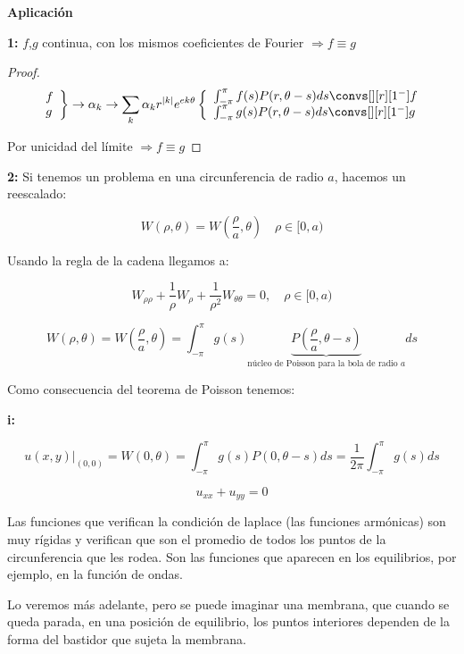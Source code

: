 		\textbf{Aplicación}

		\textbf{1:} $f$,$g$ continua, con los mismos coeficientes de Fourier $\Rightarrow f \equiv g$

		\begin{proof}
			\[
				\left. \begin{array}{l}
				f \\
				g
				\end{array} \right\} \rightarrow \alpha_k \rightarrow \sum_k \alpha_k r^{|k|} e^{ek\theta} \left\{ \begin{array}{l}
					\int^{\pi}_{-\pi} f(s) P(r, \theta - s)ds \convs[][r][1^-] f \\
					\int^{\pi}_{-\pi} g(s) P(r, \theta - s)ds \convs[][r][1^-] g
				\end{array} \right.
			\]

			Por unicidad del límite $\Rightarrow f \equiv g$
		\end{proof}


		\textbf{2:} Si tenemos un problema en una circunferencia de radio $a$, hacemos un reescalado:

		\[ W(\rho, \theta) = W(\frac{\rho}{a},\theta) \quad \rho \in [0,a) \]

		Usando la regla de la cadena llegamos a:

		\[W_{\rho \rho} + \frac{1}{\rho} W_\rho + \frac{1}{\rho^2} W_{\theta \theta} = 0, \quad \rho \in [0,a)  \]

		\[W(\rho, \theta) = W(\frac{\rho}{a},\theta) = \int^{\pi}_{-\pi} g(s)\underbrace{P(\frac{\rho}{a},\theta-s)}_{\text{núcleo de Poisson para la bola de radio }a} ds \]

		Como consecuencia del teorema de Poisson tenemos:

		\textbf{i:} 

		 \[u(x,y)|_{(0,0)}  = W(0,\theta) = \int_{-\pi}^\pi g(s) P(0, \theta - s) ds = \frac{1}{2\pi} \int_{-\pi}^\pi g(s) ds \]

		 \[ u_{xx} + u_{yy} = 0\]

		 Las funciones que verifican la condición de laplace (las funciones armónicas) son muy rígidas y verifican que son el promedio de todos los puntos de la circunferencia que les rodea. Son las funciones que aparecen en los equilibrios, por ejemplo, en la función de ondas.

		Lo veremos más adelante, pero se puede imaginar una membrana, que cuando se queda parada, en una posición de equilibrio, los puntos interiores dependen de la forma del bastidor que sujeta la membrana.

